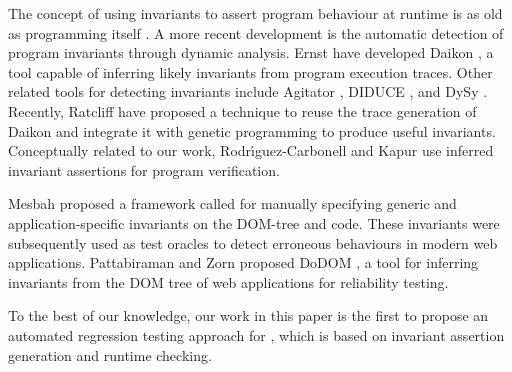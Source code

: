 The concept of using invariants to assert program behaviour at runtime is as old as programming itself \cite{Clarke:2006}. A more recent development is the automatic detection of program invariants through dynamic analysis. Ernst \etal have developed Daikon \cite{ernst2007daikon}, a tool capable of inferring likely invariants from program execution traces. Other related tools for detecting invariants include Agitator \cite{agitator:issta06}, DIDUCE \cite{Hangal02trackingdown}, and DySy \cite{Csallner08dysy}. Recently, Ratcliff \etal \cite{ratcliff:gecco11} have proposed a technique to reuse the trace generation of Daikon and integrate it with genetic programming to produce useful invariants.  %
Conceptually related to our work, Rodr{\'\i}guez-Carbonell and Kapur \cite{rodrikapurICTAC04} use  inferred invariant assertions for program verification.

Mesbah \etal \cite{mesbah:tse12} proposed a framework called \atusa for manually specifying generic and application-specific invariants on the DOM-tree and \javascript code. These invariants were subsequently used as test oracles to detect erroneous behaviours in modern web applications. Pattabiraman and Zorn proposed DoDOM \cite{dodom:2010}, a tool for inferring invariants from the DOM tree of web applications for reliability testing.

To the best of our knowledge, our work in this paper is the first to propose an automated regression testing approach for \javascript, which is based on  \javascript invariant assertion generation and runtime checking.


